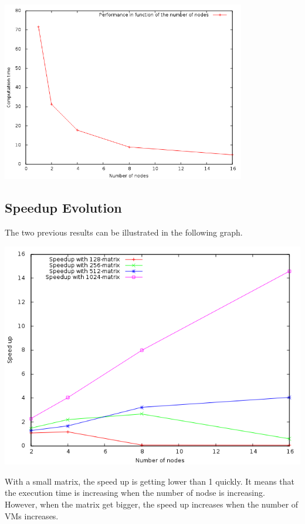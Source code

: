 \documentclass[a4paper,11pt]{article}
\begin{document}
\begin{center}
  \includegraphics[width=0.8\textwidth]{./1024perf.png}
\end{center}

\subsection{Speedup Evolution}

The two previous results can be illustrated in the following graph.

\begin{center}
  \includegraphics[width=\textwidth]{./speedup.png}
\end{center}

With a small matrix, the speed up is getting lower than 1 quickly. It means
that the execution time is increasing when the number of nodse is increasing.
However, when the matrix get bigger, the speed up increases when the number
of VMs increases.
\end{document}
